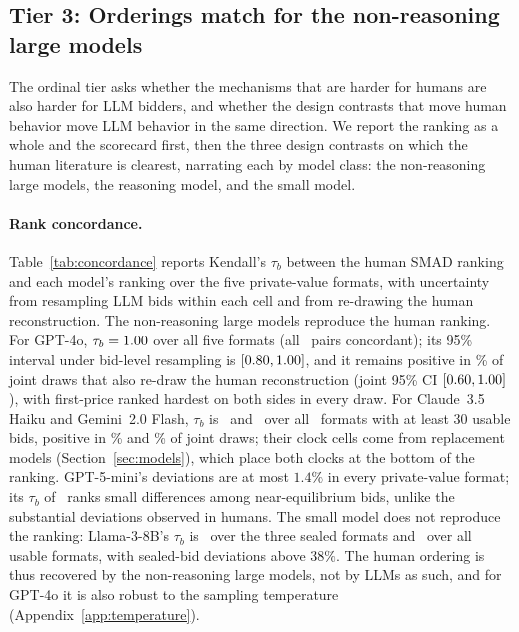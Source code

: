 \documentclass[acmsmall,screen,review]{acmart}
\newcommand{\rev}[1]{{\color{blue}#1}}
\newcommand{\rev}[1]{#1}
\begin{document}
\subsection{\texorpdfstring{Tier 3: Orderings match for the non-reasoning large models}{Tier 3: Orderings match for the non-reasoning large models}}\label{sec:tier_orderings}

The ordinal tier asks whether the mechanisms that are harder for humans are also harder for LLM bidders, and whether the design contrasts that move human behavior move LLM behavior in the same direction. We report the ranking as a whole and the scorecard first, then the three design contrasts on which the human literature is clearest, narrating each by model class: the non-reasoning large models, the reasoning model, and the small model.

\paragraph{Rank concordance.}
Table~\ref{tab:concordance} reports Kendall's $\tau_b$ between the human SMAD ranking and each model's ranking over the five private-value formats, with uncertainty from resampling LLM bids within each cell and from re-drawing the human reconstruction. The non-reasoning large models reproduce the human ranking. \rev{For GPT-4o, $\tau_b = 1.00$ over all five formats (all \TauFiveConc\ pairs concordant); its 95\% interval under bid-level resampling is $[0.80, 1.00]$, and it remains positive in \TauFivePGpt\% of joint draws that also re-draw the human reconstruction (joint 95\% CI $[0.60, 1.00]$), with first-price ranked hardest on both sides in every draw. For Claude~3.5 Haiku and Gemini~2.0 Flash, $\tau_b$ is \TauAllClaude\ and \TauAllGemini\ over all \TauKAllClaude\ formats with at least 30 usable bids, positive in \TauPAllClaude\% and \TauPAllGemini\% of joint draws; their clock cells come from replacement models (Section~\ref{sec:models}), which place both clocks at the bottom of the ranking. GPT-5-mini's deviations are at most $1.4\%$ in every private-value format; its $\tau_b$ of \TauAllMini\ ranks small differences among near-equilibrium bids, unlike the substantial deviations observed in humans. The small model does not reproduce the ranking: Llama-3-8B's $\tau_b$ is \TauSealedLlama\ over the three sealed formats and \TauAllLlama\ over all usable formats, with sealed-bid deviations above $38\%$.} The human ordering is thus recovered by the non-reasoning large models, not by LLMs as such, and for GPT-4o it is also robust to the sampling temperature (Appendix~\ref{app:temperature}).
\end{document}
